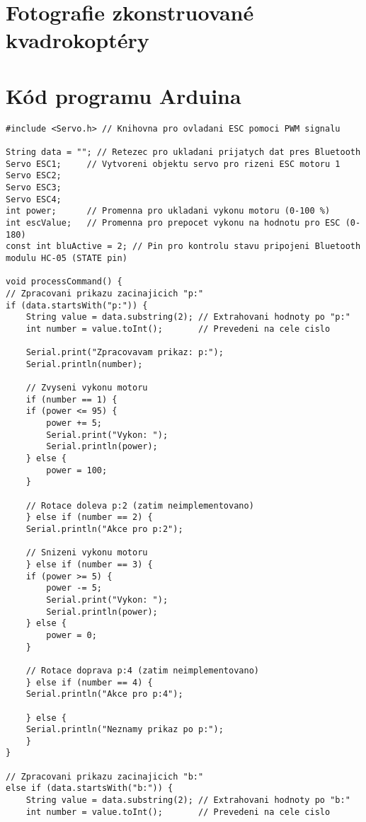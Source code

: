 \documentclass[12pt]{report}
\begin{document}
\begin{appendices}
	\chapter{Fotografie zkonstruované kvadrokoptéry}	
	\lipsum[1]
\chapter{Kód programu Arduina}
\begin{lstlisting}[title={}, caption={}, label={}, basicstyle=\footnotesize\ttfamily, inputencoding=utf8]
#include <Servo.h> // Knihovna pro ovladani ESC pomoci PWM signalu

String data = ""; // Retezec pro ukladani prijatych dat pres Bluetooth
Servo ESC1;     // Vytvoreni objektu servo pro rizeni ESC motoru 1
Servo ESC2;
Servo ESC3;
Servo ESC4;
int power;      // Promenna pro ukladani vykonu motoru (0-100 %)
int escValue;   // Promenna pro prepocet vykonu na hodnotu pro ESC (0-180)
const int bluActive = 2; // Pin pro kontrolu stavu pripojeni Bluetooth modulu HC-05 (STATE pin)

void processCommand() {
// Zpracovani prikazu zacinajicich "p:"
if (data.startsWith("p:")) {
	String value = data.substring(2); // Extrahovani hodnoty po "p:"
	int number = value.toInt();       // Prevedeni na cele cislo

	Serial.print("Zpracovavam prikaz: p:");
	Serial.println(number);

	// Zvyseni vykonu motoru
	if (number == 1) {
	if (power <= 95) {
		power += 5;
		Serial.print("Vykon: ");
		Serial.println(power);
	} else {
		power = 100;
	}

	// Rotace doleva p:2 (zatim neimplementovano)
	} else if (number == 2) {
	Serial.println("Akce pro p:2");

	// Snizeni vykonu motoru
	} else if (number == 3) {
	if (power >= 5) {
		power -= 5;
		Serial.print("Vykon: ");
		Serial.println(power);
	} else {
		power = 0;
	}

	// Rotace doprava p:4 (zatim neimplementovano)
	} else if (number == 4) {
	Serial.println("Akce pro p:4");

	} else {
	Serial.println("Neznamy prikaz po p:");
	}
}

// Zpracovani prikazu zacinajicich "b:"
else if (data.startsWith("b:")) {
	String value = data.substring(2); // Extrahovani hodnoty po "b:"
	int number = value.toInt();       // Prevedeni na cele cislo


\end{lstlisting}
\end{appendices}
\end{document}
